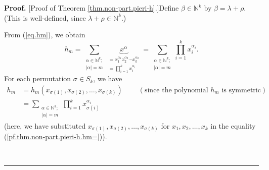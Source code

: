 \documentclass[numbers=enddot,12pt,final,onecolumn,notitlepage]{scrartcl}%
\theoremstyle{definition}
\newenvironment{proof}[1][Proof]{\noindent\textbf{#1.} }{\ \rule{0.5em}{0.5em}}
\let\sumnonlimits\sum
\let\prodnonlimits\prod
\renewcommand{\sum}{\sumnonlimits\limits}
\renewcommand{\prod}{\prodnonlimits\limits}
\begin{document}
\begin{proof}
[Proof of Theorem \ref{thm.non-part.pieri-h}.]Define $\beta\in\mathbb{N}^{k}$
by $\beta=\lambda+\rho$. (This is well-defined, since $\lambda+\rho
\in\mathbb{N}^{k}$.)

From (\ref{eq.hm}), we obtain%
\begin{equation}
h_{m}=\sum_{\substack{\alpha\in\mathbb{N}^{k};\\\left\vert \alpha\right\vert
=m}}\underbrace{x^{\alpha}}_{\substack{=x_{1}^{\alpha_{1}}x_{2}^{\alpha_{2}%
}\cdots x_{k}^{\alpha_{k}}\\=\prod_{i=1}^{k}x_{i}^{\alpha_{i}}}}=\sum
_{\substack{\alpha\in\mathbb{N}^{k};\\\left\vert \alpha\right\vert =m}%
}\prod_{i=1}^{k}x_{i}^{\alpha_{i}}. \label{pf.thm.non-part.pieri-h.hm=}%
\end{equation}
For each permutation $\sigma\in S_{k}$, we have%
\begin{align}
h_{m}  &  =h_{m}\left(  x_{\sigma\left(  1\right)  },x_{\sigma\left(
2\right)  },\ldots,x_{\sigma\left(  k\right)  }\right)
\ \ \ \ \ \ \ \ \ \ \left(  \text{since the polynomial }h_{m}\text{ is
symmetric}\right) \nonumber\\
&  =\sum_{\substack{\alpha\in\mathbb{N}^{k};\\\left\vert \alpha\right\vert
=m}}\prod_{i=1}^{k}x_{\sigma\left(  i\right)  }^{\alpha_{i}}
\label{pf.thm.non-part.pieri-h.hm=2}%
\end{align}
(here, we have substituted $x_{\sigma\left(  1\right)  },x_{\sigma\left(
2\right)  },\ldots,x_{\sigma\left(  k\right)  }$ for $x_{1},x_{2},\ldots
,x_{k}$ in the equality (\ref{pf.thm.non-part.pieri-h.hm=})).


\end{proof}
\end{document}
